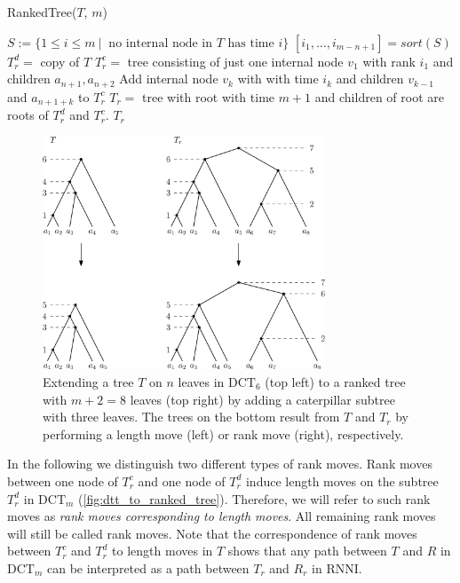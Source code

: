 \documentclass[11pt]{amsart}
\newcommand{\rnni}{\mathrm{RNNI}}
\newcommand{\dtt}{\mathrm{DCT}}
\newcommand{\summary}[1]{} %
\begin{document}
\begin{algorithm}[ht]
	\caption{RankedTree($T$, $m$)}
	\label{alg:ranked_tree}
	\begin{algorithmic}[1]
		\STATE $S:= \{1 \leq i \leq m \ |\  \text{ no internal node in } T \text{ has time } i\}$
		\STATE $[i_1, \ldots, i_{m-n+1}] = sort(S)$
		\STATE $T_r^d =$ copy of $T$
		\STATE $T_r^c =$ tree consisting of just one internal node $v_1$ with rank $i_1$ and children $a_{n+1}, a_{n+2}$
			\STATE Add internal node $v_k$ with with time $i_k$ and children $v_{k-1}$ and $a_{n+1+k}$ to $T_r^c$
		\STATE $T_r = $ tree with root with time $m+1$ and children of root are roots of $T_r^d$ and $T_r^c$.
		\ENDFOR
		\RETURN $T_r$
	\end{algorithmic}
\end{algorithm}

\begin{figure}[ht]
	\includegraphics[width=0.75\textwidth]{dtt_to_ranked_tree.eps}
	\caption{Extending a tree $T$ on $n$ leaves in $\dtt_6$ (top left) to a ranked tree with $m+2=8$ leaves (top right) by adding a caterpillar subtree with three leaves.
	The trees on the bottom result from $T$ and $T_r$ by performing a length move (left) or rank move (right), respectively.}
	\label{fig:dtt_to_ranked_tree}
\end{figure}

\summary{Moves on the extended ranked versions of trees -- $\rnni$ vs length moves}
In the following we distinguish two different types of rank moves.
Rank moves between one node of $T_r^c$ and one node of $T_r^d$ induce length moves on the subtree $T_r^d$ in $\dtt_m$ (\autoref{fig:dtt_to_ranked_tree}).
Therefore, we will refer to such rank moves as \emph{rank moves corresponding to length moves}.
All remaining rank moves will still be called rank moves.
Note that the correspondence of rank moves between $T_r^c$ and $T_r^d$ to length moves in $T$ shows that any path between $T$ and $R$ in $\dtt_m$ can be interpreted as a path between $T_r$ and $R_r$ in $\rnni$.
\end{document}
